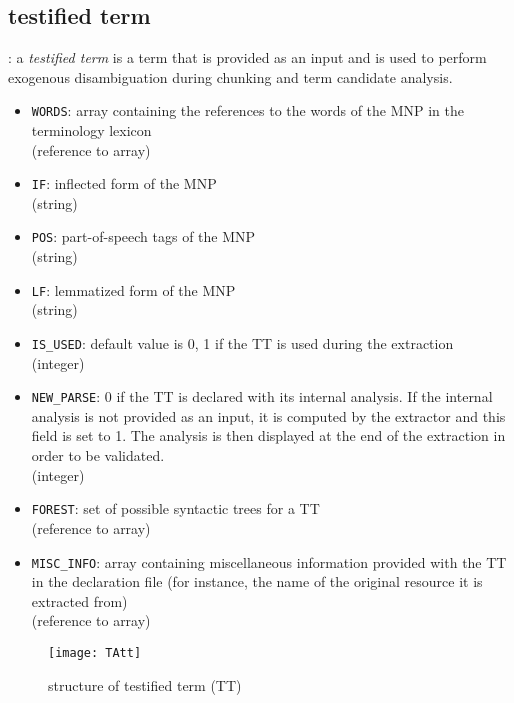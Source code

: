 \subsection{testified term}\label{termeAtteste}
\begin{definition}
  : a \emph{testified term} is a term
that is provided as an input and is used to perform exogenous
disambiguation during chunking and term candidate analysis.
\end{definition}
\begin{itemize}
\item \texttt{WORDS}: array containing the references to the words of the MNP in the terminology lexicon\\ (reference to array)
\item \texttt{IF}: inflected form of the MNP\\(string)
\item \texttt{POS}: part-of-speech tags of the MNP\\(string)
\item \texttt{LF}: lemmatized form of the MNP\\(string)
\item \texttt{IS\_USED}: default value is 0, 1 if the TT is used during the extraction\\ (integer)
\item \texttt{NEW\_PARSE}: 0 if the TT is declared with its internal
  analysis. If the internal analysis is not provided as  an input, it is computed by the extractor and this field is set to 1. The analysis is then displayed at the end of the extraction in order to be validated.\\ (integer)
\item \texttt{FOREST}: set of possible syntactic trees for a TT\\ (reference to array)
\item \texttt{MISC\_INFO}: array containing miscellaneous information provided with the TT in the declaration file (for instance, the name of the original resource it is extracted from)\\ (reference to array)
\end{itemize}

\begin{figure}[!htbp]
\begin{center}
\texttt{[image: TAtt]}
\caption{structure of testified term (TT)}\label{Fig:TT_str}
\end{center}
\end{figure}

